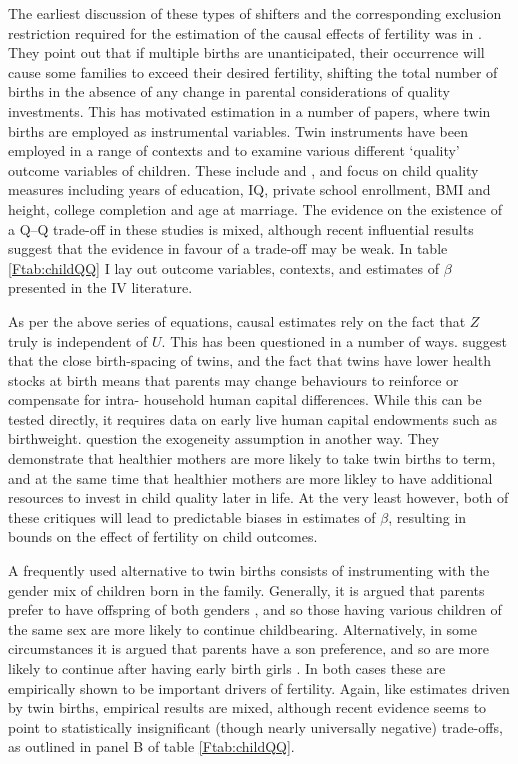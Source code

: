 The earliest discussion of these types of shifters and the corresponding 
exclusion restriction required for the estimation of the causal effects of 
fertility was in \citet{RosenzweigWolpin1980}. They point out that if multiple 
births are unanticipated, their occurrence will cause some families to exceed 
their desired fertility, shifting the total number of births in the absence of 
any change in parental considerations of quality investments. This has motivated 
estimation in a number of papers, where twin births are employed as instrumental 
variables.  Twin instruments have been employed in a range of contexts and
to examine various different `quality' outcome variables of children. These 
include \citet{Blacketal2005,Caceres2006,Lietal2008,Dayiogluetal2009,Sanhueza2009,
Blacketal2010,Angristetal2010,FitzsimonsMalde2010} and \citet{SouzaPonczek2012}, 
and focus on child quality measures including years of education, IQ, private 
school enrollment, BMI and height, college completion and age at marriage.  The 
evidence on the existence of a Q--Q trade-off in these studies is mixed, 
although recent influential results suggest that the evidence in favour of a 
trade-off may be weak.  In table \ref{Ftab:childQQ} I lay out outcome variables, 
contexts, and estimates of $\beta$ presented in the IV literature.

As per the above series of equations, causal estimates rely on the fact that
$Z$ truly is independent of $U$.  This has been questioned in a number of ways.
\citet{RosenzweigZhang2009} suggest that the close birth-spacing of twins, and 
the fact that twins have lower health stocks at birth \citep{Almondetal2005}
means that parents may change behaviours to reinforce or compensate for intra-%
household human capital differences.  While this can be tested directly, it 
requires data on early live human capital endowments such as birthweight.  
\citet{BhalotraClarke2015} question the exogeneity assumption in another way.
They demonstrate that healthier mothers are more likely to take twin births
to term, and at the same time that healthier mothers are more likley to have
additional resources to invest in child quality later in life.  At the very
least however, both of these critiques will lead to predictable biases in 
estimates of $\beta$, resulting in bounds on the effect of fertility on child
outcomes.

A frequently used alternative to twin births consists of instrumenting with the 
gender mix of children born in the family. Generally, it is argued that parents
prefer to have offspring of both genders \citep{ConleyGlauber2006,Angristetal2010,
Beckeretal2010,MillimetWang2011,FitzsimonsMalde2014}, and so those having various 
children of the same sex are more likely to continue childbearing. Alternatively, 
in some circumstances it is argued that parents have a son preference, and so are 
more likely to continue after having early birth girls \citep{Lee2008,
KumarKugler2011}. In both cases these are empirically shown to be important 
drivers of fertility.  Again, like estimates driven by twin births, empirical 
results are mixed, although recent evidence seems to point to statistically 
insignificant (though nearly universally negative) trade-offs, as outlined in 
panel B of table \ref{Ftab:childQQ}.

